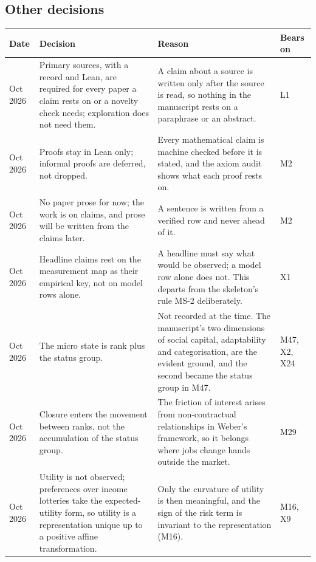 \documentclass[10pt]{article}
\begin{document}
\subsection*{Other decisions}
{\small
\begin{longtable}{>{\raggedright\arraybackslash}p{2.0cm} >{\raggedright\arraybackslash}p{8.0cm} >{\raggedright\arraybackslash}p{10.0cm} >{\raggedright\arraybackslash}p{3.0cm}}
\toprule Date & Decision & Reason & Bears on \\ \midrule \endhead
10 Oct 2026 & Primary sources, with a record and Lean, are required for every paper a claim rests on or a novelty check needs; exploration does not need them. & A claim about a source is written only after the source is read, so nothing in the manuscript rests on a paraphrase or an abstract. & L1 \\ \midrule
10 Oct 2026 & Proofs stay in Lean only; informal proofs are deferred, not dropped. & Every mathematical claim is machine checked before it is stated, and the axiom audit shows what each proof rests on. & M2 \\ \midrule
10 Oct 2026 & No paper prose for now; the work is on claims, and prose will be written from the claims later. & A sentence is written from a verified row and never ahead of it. & M2 \\ \midrule
10 Oct 2026 & Headline claims rest on the measurement map as their empirical key, not on model rows alone. & A headline must say what would be observed; a model row alone does not. This departs from the skeleton's rule MS-2 deliberately. & X1 \\ \midrule
10 Oct 2026 & The micro state is rank plus the status group. & Not recorded at the time. The manuscript's two dimensions of social capital, adaptability and categorisation, are the evident ground, and the second became the status group in M47. & M47, X2, X24 \\ \midrule
10 Oct 2026 & Closure enters the movement between ranks, not the accumulation of the status group. & The friction of interest arises from non-contractual relationships in Weber's framework, so it belongs where jobs change hands outside the market. & M29 \\ \midrule
10 Oct 2026 & Utility is not observed; preferences over income lotteries take the expected-utility form, so utility is a representation unique up to a positive affine transformation. & Only the curvature of utility is then meaningful, and the sign of the risk term is invariant to the representation (M16). & M16, X9 \\ \midrule

\end{longtable}}
\end{document}
